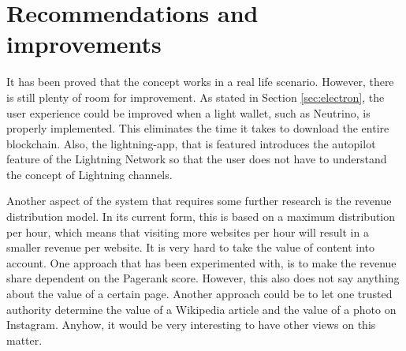  

\section{Recommendations and improvements}
It has been proved that the concept works in a real life scenario. However, there is still plenty of room for improvement. As stated in Section \ref{sec:electron}, the user experience could be improved when a light wallet, such as Neutrino, is properly implemented. This eliminates the time it takes to download the entire blockchain. Also, the lightning-app, that is featured introduces the autopilot feature of the Lightning Network so that the user does not have to understand the concept of Lightning channels. 

Another aspect of the system that requires some further research is the revenue distribution model. In its current form, this is based on a maximum distribution per hour, which means that visiting more websites per hour will result in a smaller revenue per website. It is very hard to take the value of content into account. One approach that has been experimented with, is to make the revenue share dependent on the Pagerank score. However, this also does not say anything about the value of a certain page. Another approach could be to let one trusted authority determine the value of a Wikipedia article and the value of a photo on Instagram. Anyhow, it would be very interesting to have other views on this matter. 